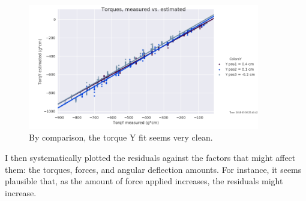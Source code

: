 \documentclass[preprint,12pt,3p]{elsarticle}
\begin{document}
\begin{figure}[H]
\centering
            \includegraphics[width=0.9\textwidth]{images/round1/TorqY_Colors_Y.png}%
            \caption{By comparison, the torque Y fit seems very clean.}
\end{figure} 

I then systematically plotted the residuals against the factors that might 
affect them: the torques, forces, and angular deflection amounts. For instance, it seems plausible
that, as the amount of force applied increases, the residuals might increase.
\end{document}
